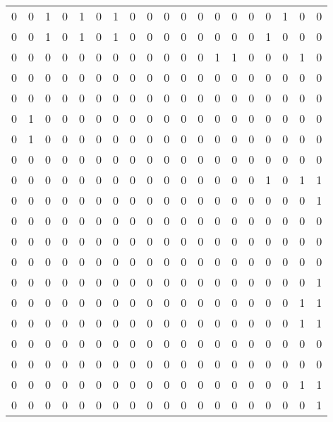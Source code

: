 \begin{table}[!ht]
    \centering
    \setlength\tabcolsep{2pt}
    \begin{tabular}{lllllllllllllllllll}
        0 & 0 & 1 & 0 & 1 & 0 & 1 & 0 & 0 & 0 & 0 & 0 & 0 & 0 & 0 & 0 & 1 & 0 & 0 \\ 
        0 & 0 & 1 & 0 & 1 & 0 & 1 & 0 & 0 & 0 & 0 & 0 & 0 & 0 & 0 & 1 & 0 & 0 & 0 \\ 
        0 & 0 & 0 & 0 & 0 & 0 & 0 & 0 & 0 & 0 & 0 & 0 & 1 & 1 & 0 & 0 & 0 & 1 & 0 \\ 
        0 & 0 & 0 & 0 & 0 & 0 & 0 & 0 & 0 & 0 & 0 & 0 & 0 & 0 & 0 & 0 & 0 & 0 & 0 \\ 
        0 & 0 & 0 & 0 & 0 & 0 & 0 & 0 & 0 & 0 & 0 & 0 & 0 & 0 & 0 & 0 & 0 & 0 & 0 \\ 
        0 & 1 & 0 & 0 & 0 & 0 & 0 & 0 & 0 & 0 & 0 & 0 & 0 & 0 & 0 & 0 & 0 & 0 & 0 \\ 
        0 & 1 & 0 & 0 & 0 & 0 & 0 & 0 & 0 & 0 & 0 & 0 & 0 & 0 & 0 & 0 & 0 & 0 & 0 \\ 
        0 & 0 & 0 & 0 & 0 & 0 & 0 & 0 & 0 & 0 & 0 & 0 & 0 & 0 & 0 & 0 & 0 & 0 & 0 \\ 
        0 & 0 & 0 & 0 & 0 & 0 & 0 & 0 & 0 & 0 & 0 & 0 & 0 & 0 & 0 & 1 & 0 & 1 & 1 \\ 
        0 & 0 & 0 & 0 & 0 & 0 & 0 & 0 & 0 & 0 & 0 & 0 & 0 & 0 & 0 & 0 & 0 & 0 & 1 \\ 
        0 & 0 & 0 & 0 & 0 & 0 & 0 & 0 & 0 & 0 & 0 & 0 & 0 & 0 & 0 & 0 & 0 & 0 & 0 \\ 
        0 & 0 & 0 & 0 & 0 & 0 & 0 & 0 & 0 & 0 & 0 & 0 & 0 & 0 & 0 & 0 & 0 & 0 & 0 \\ 
        0 & 0 & 0 & 0 & 0 & 0 & 0 & 0 & 0 & 0 & 0 & 0 & 0 & 0 & 0 & 0 & 0 & 0 & 0 \\ 
        0 & 0 & 0 & 0 & 0 & 0 & 0 & 0 & 0 & 0 & 0 & 0 & 0 & 0 & 0 & 0 & 0 & 0 & 1 \\ 
        0 & 0 & 0 & 0 & 0 & 0 & 0 & 0 & 0 & 0 & 0 & 0 & 0 & 0 & 0 & 0 & 0 & 1 & 1 \\ 
        0 & 0 & 0 & 0 & 0 & 0 & 0 & 0 & 0 & 0 & 0 & 0 & 0 & 0 & 0 & 0 & 0 & 1 & 1 \\ 
        0 & 0 & 0 & 0 & 0 & 0 & 0 & 0 & 0 & 0 & 0 & 0 & 0 & 0 & 0 & 0 & 0 & 0 & 0 \\ 
        0 & 0 & 0 & 0 & 0 & 0 & 0 & 0 & 0 & 0 & 0 & 0 & 0 & 0 & 0 & 0 & 0 & 0 & 0 \\ 
        0 & 0 & 0 & 0 & 0 & 0 & 0 & 0 & 0 & 0 & 0 & 0 & 0 & 0 & 0 & 0 & 0 & 1 & 1 \\ 
        0 & 0 & 0 & 0 & 0 & 0 & 0 & 0 & 0 & 0 & 0 & 0 & 0 & 0 & 0 & 0 & 0 & 0 & 1 \\ 

\end{tabular}
\end{table}
